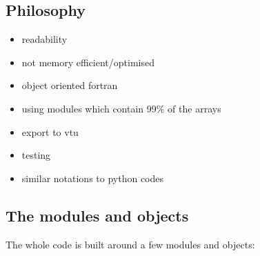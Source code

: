 \subsection{Philosophy}
\begin{itemize}
\item readability
\item not memory efficient/optimised
\item object oriented fortran
\item using modules which contain 99\% of the arrays
\item export to vtu 
\item testing
\item similar notations to python codes
\end{itemize}


\subsection{The modules and objects}
The whole code is built around a few modules and objects:

